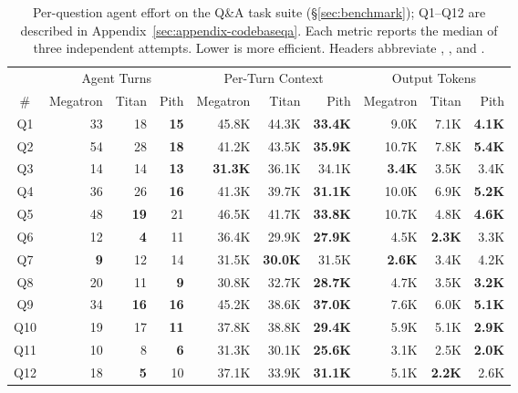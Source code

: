 \begin{table}[t]
  \centering
  \small
  \vspace{-7pt}
  \caption{Per-question agent effort on the Q\&A task suite
  (\S\ref{sec:benchmark}); Q1--Q12 are described in
  Appendix~\ref{sec:appendix-codebaseqa}. Each metric reports the
  median of three independent attempts. Lower is more efficient.
  Headers abbreviate \megatron, \torchtitan, and \sys.}
  \label{tab:agent-efforts-codebaseqa}
  \begin{tabular}{c|rrr|rrr|rrr}
    \toprule
       & \multicolumn{3}{c|}{Agent Turns}    & \multicolumn{3}{c|}{Per-Turn Context}            & \multicolumn{3}{c}{Output Tokens} \\
    \# & Megatron & Titan & Pith & Megatron & Titan & Pith & Megatron & Titan & Pith \\
    \midrule
    Q1  & 33         & 18          & \textbf{15} & 45.8K          & 44.3K          & \textbf{33.4K} & 9.0K           & 7.1K           & \textbf{4.1K}  \\
    Q2  & 54         & 28          & \textbf{18} & 41.2K          & 43.5K          & \textbf{35.9K} & 10.7K          & 7.8K           & \textbf{5.4K}  \\
    Q3  & 14         & 14          & \textbf{13} & \textbf{31.3K} & 36.1K          & 34.1K          & \textbf{3.4K}  & 3.5K           & 3.4K           \\
    Q4  & 36         & 26          & \textbf{16} & 41.3K          & 39.7K          & \textbf{31.1K} & 10.0K          & 6.9K           & \textbf{5.2K}  \\
    Q5  & 48         & \textbf{19} & 21          & 46.5K          & 41.7K          & \textbf{33.8K} & 10.7K          & 4.8K           & \textbf{4.6K}  \\
    Q6  & 12         & \textbf{4}  & 11          & 36.4K          & 29.9K          & \textbf{27.9K} & 4.5K           & \textbf{2.3K}  & 3.3K           \\
    Q7  & \textbf{9} & 12          & 14          & 31.5K          & \textbf{30.0K} & 31.5K          & \textbf{2.6K}  & 3.4K           & 4.2K           \\
    Q8  & 20         & 11          & \textbf{9}  & 30.8K          & 32.7K          & \textbf{28.7K} & 4.7K           & 3.5K           & \textbf{3.2K}  \\
    Q9  & 34         & \textbf{16} & \textbf{16} & 45.2K          & 38.6K          & \textbf{37.0K} & 7.6K           & 6.0K           & \textbf{5.1K}  \\
    Q10 & 19         & 17          & \textbf{11} & 37.8K          & 38.8K          & \textbf{29.4K} & 5.9K           & 5.1K           & \textbf{2.9K}  \\
    Q11 & 10         & 8           & \textbf{6}  & 31.3K          & 30.1K          & \textbf{25.6K} & 3.1K           & 2.5K           & \textbf{2.0K}  \\
    Q12 & 18         & \textbf{5}  & 10          & 37.1K          & 33.9K          & \textbf{31.1K} & 5.1K           & \textbf{2.2K}  & 2.6K           \\
    \bottomrule
  \end{tabular}
\end{table}

